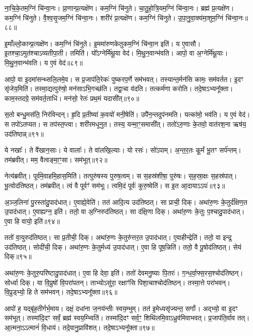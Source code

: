 ना॒चि॒के॒तम॒ग्निं चि॑न्वा॒नः। 
प्रा॒णान्प्र॒त्यक्षे॑ण। कम॒ग्निं चि॑नुते। चा॒तु॒\ar{}हो॒त्रि॒य\-म॒ग्निं चि॑न्वा॒नः। 
ब्रह्म॑ प्र॒त्यक्षे॑ण। कम॒ग्निं चि॑नुते। वै॒श्व॒सृ॒जम॒ग्निं चि॑न्वा॒नः। 
शरी॑रं प्र॒त्यक्षे॑ण। कम॒ग्निं चि॑नुते। उ॒पा॒नु॒वा॒क्य॑\-मा॒शुम॒ग्निं चि॑न्वा॒नः॥८८॥


इ॒माँल्लो॒कान्प्र॒त्यक्षे॑ण। कम॒ग्निं चि॑नुते। 
इ॒ममा॑रुणकेतुकम॒ग्निं चि॑न्वा॒न इति॑। य ए॒वासौ। 
इ॒तश्चा॒ऽमुत॑श्चाऽव्यतीपा॒ती। तमिति॑। 
यो᳚ऽग्नेर्मि॑थू॒या वेद॑। मि॒थु॒न॒वान्भ॑वति। 
आपो॒ वा अ॒ग्नेर्मि॑थू॒याः। मि॒थु॒न॒वान्भ॑वति। य ए॒वं वेद॑॥८९॥\anuvakamend


आपो॒ वा इ॒दमा॑सन्थ्सलि॒लमे॒व। स प्र॒जाप॑ति॒रेकः॑ पुष्करप॒र्णे सम॑भवत्। 
तस्यान्त॒र्मन॑सि कामः॒ सम॑वर्तत। इ॒दꣳ सृ॑जेय॒मिति॑। 
तस्मा॒द्यत्पुरु॑षो॒ मन॑साऽभि॒गच्छ॑ति। तद्वा॒चा व॑दति। 
तत्कर्म॑णा करोति। तदे॒षाऽभ्यनू᳚क्ता। 
काम॒स्तदग्रे॒ सम॑वर्त॒ताधि॑। मन॑सो॒ रेतः॑ प्रथ॒मं यदासी᳚त्॥९०॥


स॒तो बन्धु॒मस॑ति॒ निर॑विन्दन्। हृ॒दि प्र॒तीष्या॑ क॒वयो॑ मनी॒षेति॑। 
उपै॑न॒न्तदुप॑नमति। यत्का॑मो॒ भव॑ति। य ए॒वं वेद॑। 
स तपो॑ऽतप्यत। स तप॑स्त॒प्त्वा। शरी॑रमधूनुत। तस्य॒ यन्मा॒ꣳ॒समासी᳚त्। 
ततो॑ऽरु॒णाः के॒तवो॒ वात॑रश॒ना ऋष॑य॒ उद॑तिष्ठन्न्॥९१॥


ये नखाः᳚। ते वै॑खान॒साः। ये वालाः᳚। ते वा॑लखि॒ल्याः। 
यो रसः॑। सो॑ऽपाम्। अ॒न्त॒र॒तः कू॒र्मं भू॒तꣳ सर्प॑न्तम्। 
तम॑ब्रवीत्। मम॒ वैत्वङ्मा॒ꣳ॒सा। सम॑भूत्॥९२॥


नेत्य॑ब्रवीत्। पूर्व॑मे॒वाहमि॒हास॒मिति॑। 
तत्पुरु॑षस्य पुरुष॒त्वम्। स स॒हस्र॑शी\ur{}षा॒ पुरु॑षः। 
स॒ह॒स्रा॒क्षः स॒हस्र॑पात्। भू॒त्वोद॑तिष्ठत्। 
तम॑ब्रवीत्। त्वं वै पूर्वꣳ॑ सम॑भूः। 
त्वमि॒दं पूर्वः॑ कुरु॒ष्वेति॑। स इ॒त आ॒दायाऽऽपः॑॥९३॥


अ॒ञ्ज॒लिना॑ पु॒रस्ता॑दु॒पाद॑धात्। ए॒वाह्ये॒वेति॑। 
तत॑ आदि॒त्य उद॑तिष्ठत्। सा प्राची॒ दिक्। 
अथा॑रु॒णः के॒तुर्द॑क्षिण॒त उ॒पाद॑धात्। 
ए॒वाह्यग्न॒ इति॑। ततो॒ वा अ॒ग्निरुद॑तिष्ठत्। 
सा द॑क्षि॒णा दिक्। अथा॑रु॒णः के॒तुः प॒श्चादु॒पाद॑धात्। 
ए॒वा हि वायो॒ इति॑॥९४॥


ततो॑ वा॒युरुद॑तिष्ठत्। सा प्र॒तीची॒ दिक्। 
अथा॑रु॒णः के॒तुरु॑त्तर॒त उ॒पाद॑धात्। ए॒वाहीन्द्रेति॑। 
ततो॒ वा इन्द्र॒ उद॑तिष्ठत्। सोदी॑ची॒ दिक्। 
अथा॑रु॒णः के॒तुर्मध्य॑ उ॒पाद॑धात्। ए॒वा हि पूष॒न्निति॑। 
ततो॒ वै पू॒षोद॑तिष्ठत्। सेयं दिक्॥९५॥


अथा॑रु॒णः के॒तुरु॒परि॑ष्टादु॒पाद॑धात्। ए॒वा हि देवा॒ इति॑। 
ततो॑ देवमनु॒ष्याः पि॒तरः॑। ग॒न्ध॒र्वा॒फ्स॒रस॒श्चोद॑तिष्ठन्। 
सोर्ध्वा दिक्। या वि॒प्रुषो॑ वि॒परा॑पतन्। 
ताभ्योऽसु॑रा॒ रक्षाꣳ॑सि पिशा॒चाश्चोद॑तिष्ठन्। तस्मा॒त्ते परा॑भवन्। 
वि॒प्रुड्भ्यो॒ हि ते सम॑भवन्। तदे॒षाऽभ्यनू᳚क्ता॥९६॥


आपो॑ ह॒ यद्बृ॑ह॒तीर्गर्भ॒माय\snn{}। दक्षं॒ दधा॑ना ज॒नय॑न्तीः स्वय॒म्भुम्। 
तत॑ इ॒मेध्यसृ॑ज्यन्त॒ सर्गाः᳚। अद्भ्यो॒ वा इ॒दꣳ सम॑भूत्। 
तस्मा॑दि॒दꣳ सर्वं॒ ब्रह्म॑ स्वय॒म्भ्विति॑। 
तस्मा॑दि॒दꣳ सर्व॒ꣳ॒ शिथि॑लमि॒वाऽध्रुव॑मिवाभवत्। 
प्र॒जाप॑ति॒र्वाव तत्। आ॒त्मना॒ऽऽत्मानं॑ वि॒धाय॑। 
तदे॒वानु॒प्रावि॑शत्। तदे॒षाऽभ्यनू᳚क्ता॥९७॥


